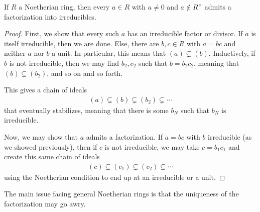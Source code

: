 \documentclass[10pt]{mypackage}
\begin{document}
\begin{proposition}
  If $R$ a Noetherian ring, then every $a\in R$ with $a\neq 0$ and $a\notin R^{\times}$ admits a factorization into irreducibles.
\end{proposition}
\begin{proof}
  First, we show that every such $a$ has an irreducible factor or divisor. If $a$ is itself irreducible, then we are done. Else, there are $b,c\in R$ with $a = bc$ and neither $a$ nor $b$ a unit. In particular, this means that $\left( a \right)\subsetneq \left( b \right)$. Inductively, if $b$ is not irreducible, then we may find $b_2,c_2$ such that $b = b_2 c_2$, meaning that $\left( b \right)\subsetneq \left( b_2 \right)$, and so on and so forth.\newline

  This gives a chain of ideals
  \begin{align*}
    \left( a \right)\subsetneq \left( b \right)\subsetneq \left( b_2 \right)\subsetneq \cdots
  \end{align*}
  that eventually stabilizes, meaning that there is some $b_N$ such that $b_N$ is irreducible.\newline

  Now, we may show that $a$ admits a factorization. If $a = bc$ with $b$ irreducible (as we showed previously), then if $c$ is not irreducible, we may take $c = b_1c_1$ and create this same chain of ideals
  \begin{align*}
    \left( c \right)\subsetneq \left( c_1 \right)\subsetneq \left( c_2 \right)\subsetneq\cdots
  \end{align*}
  using the Noetherian condition to end up at an irreducible or a unit.
\end{proof}
The main issue facing general Noetherian rings is that the uniqueness of the factorization may go awry.
\end{document}
